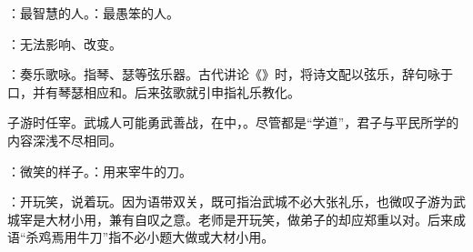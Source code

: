 {
\item {}：最智慧的人。：最愚笨的人。
\item {}：无法影响、改变。
}
{}  %


{
\item {}：奏乐歌咏。指琴、瑟等弦乐器。古代讲论《》时，将诗文配以弦乐，辞句咏于口，并有琴瑟相应和。后来弦歌就引申指礼乐教化。

子游时任宰。武城人可能勇武善战，在中，。尽管都是“学道”，君子与平民所学的内容深浅不尽相同。

\item {}：微笑的样子。：用来宰牛的刀。

\item {}：开玩笑，说着玩。因为语带双关，既可指治武城不必大张礼乐，也微叹子游为武城宰是大材小用，兼有自叹之意。老师是开玩笑，做弟子的却应郑重以对。后来成语“杀鸡焉用牛刀”指不必小题大做或大材小用。
}
{}


